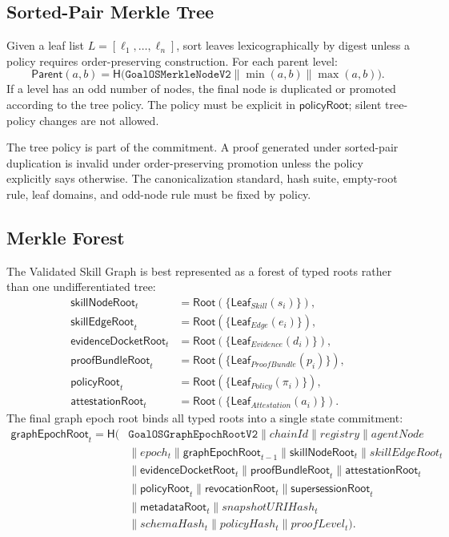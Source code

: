 \documentclass[11pt,letterpaper]{article}
\newcommand{\domain}[1]{\texttt{#1}}
\newcommand{\hash}{\mathsf{H}}
\newcommand{\Root}{\mathsf{Root}}
\newcommand{\Leaf}{\mathsf{Leaf}}
\newcommand{\GraphRoot}{\mathsf{graphEpochRoot}}
\newcommand{\SkillRoot}{\mathsf{skillNodeRoot}}
\newcommand{\EvidenceRoot}{\mathsf{evidenceDocketRoot}}
\newcommand{\BundleRoot}{\mathsf{proofBundleRoot}}
\newcommand{\PolicyRoot}{\mathsf{policyRoot}}
\newcommand{\AttestationRoot}{\mathsf{attestationRoot}}
\newcommand{\RevocationRoot}{\mathsf{revocationRoot}}
\newcommand{\SupersessionRoot}{\mathsf{supersessionRoot}}
\newcommand{\MetadataRoot}{\mathsf{metadataRoot}}
\begin{document}
\subsection{Sorted-Pair Merkle Tree}
Given a leaf list $L = [\ell_1, \ldots, \ell_n]$, sort leaves lexicographically by digest unless a policy requires order-preserving construction. For each parent level:
\begin{equation}
\mathsf{Parent}(a,b)=\hash\big(\domain{GoalOSMerkleNodeV2} \parallel \min(a,b) \parallel \max(a,b)\big).\label{eq:parent}
\end{equation}
If a level has an odd number of nodes, the final node is duplicated or promoted according to the tree policy. The policy must be explicit in $\PolicyRoot$; silent tree-policy changes are not allowed.

\begin{lawbox}
The tree policy is part of the commitment. A proof generated under sorted-pair duplication is invalid under order-preserving promotion unless the policy explicitly says otherwise. The canonicalization standard, hash suite, empty-root rule, leaf domains, and odd-node rule must be fixed by policy.
\end{lawbox}

\subsection{Merkle Forest}
The Validated Skill Graph is best represented as a forest of typed roots rather than one undifferentiated tree:
\begin{align}
\SkillRoot_t &= \Root(\{\Leaf_{Skill}(s_i)\}),\\
\mathsf{skillEdgeRoot}_t &= \Root(\{\Leaf_{Edge}(e_i)\}),\\
\EvidenceRoot_t &= \Root(\{\Leaf_{Evidence}(d_i)\}),\\
\BundleRoot_t &= \Root(\{\Leaf_{ProofBundle}(p_i)\}),\\
\PolicyRoot_t &= \Root(\{\Leaf_{Policy}(\pi_i)\}),\\
\AttestationRoot_t &= \Root(\{\Leaf_{Attestation}(a_i)\}).
\end{align}
The final graph epoch root binds all typed roots into a single state commitment:
\begin{align}
\GraphRoot_t = \hash(&\domain{GoalOSGraphEpochRootV2} \parallel chainId \parallel registry \parallel agentNode \\
&\parallel epoch_t \parallel \GraphRoot_{t-1} \parallel \SkillRoot_t \parallel skillEdgeRoot_t \\
&\parallel \EvidenceRoot_t \parallel \BundleRoot_t \parallel \AttestationRoot_t \\
&\parallel \PolicyRoot_t \parallel \RevocationRoot_t \parallel \SupersessionRoot_t \\
&\parallel \MetadataRoot_t \parallel snapshotURIHash_t \\
&\parallel schemaHash_t \parallel policyHash_t \parallel proofLevel_t).
\end{align}
\end{document}
